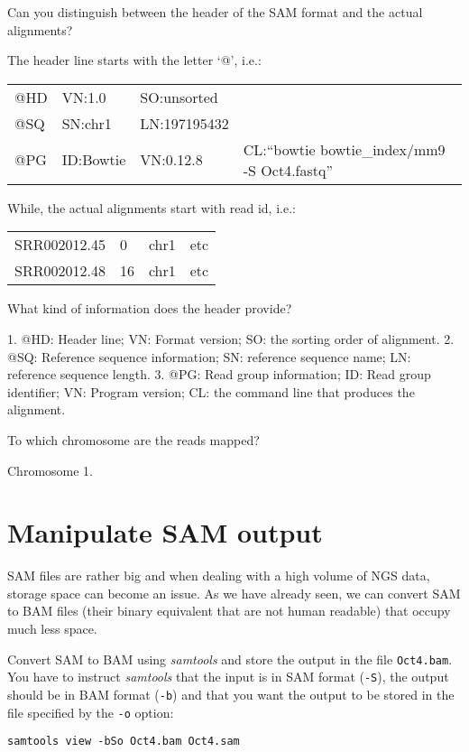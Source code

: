 \begin{questions}
Can you distinguish between the header of the SAM format and the actual alignments?
\begin{answer}
The header line starts with the letter `@', i.e.: 

\begin{tabular}{llll}
@HD & VN:1.0 & SO:unsorted & \\
@SQ & SN:chr1 & LN:197195432 & \\
@PG & ID:Bowtie &      VN:0.12.8  & CL:``bowtie bowtie\_index/mm9 -S Oct4.fastq'' \\
\end{tabular}

While, the actual alignments start with read id, i.e.:

\begin{tabular}{llll}
SRR002012.45 & 0 & chr1 & etc \\
SRR002012.48 & 16 & chr1 & etc \\
\end{tabular}
\end{answer}

What kind of information does the header provide?
\begin{answer}
1. @HD: Header line; VN: Format version; SO: the sorting order of alignment.
2. @SQ: Reference sequence information; SN: reference sequence name; LN: reference sequence length.
3. @PG: Read group information; ID: Read group identifier; VN: Program version; CL: the command line that produces the alignment.
\end{answer}

To which chromosome are the reads mapped? 
\begin{answer}
Chromosome 1.
\end{answer}
\end{questions}

\section{Manipulate SAM output}

\begin{note}
SAM files are rather big and when dealing with a high volume of NGS data,
storage space can become an issue. As we have already seen, we can convert SAM
to BAM files (their binary equivalent that are not human readable) that occupy
much less space.
\end{note}

\begin{steps}
Convert SAM to BAM using \emph{samtools} and store the output in the file
\texttt{Oct4.bam}. You have to instruct \emph{samtools} that the input is in SAM
format (\texttt{-S}), the output should be in BAM format (\texttt{-b}) and that
you want the output to be stored in the file specified by the \texttt{-o}
option:

\begin{lstlisting}
samtools view -bSo Oct4.bam Oct4.sam
\end{lstlisting}
\end{steps}

